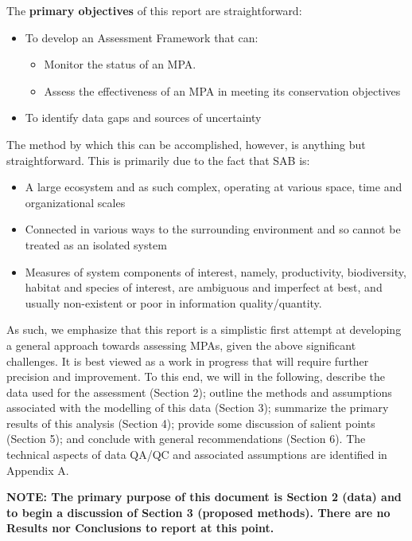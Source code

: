\documentclass[letterpaper,portrait,11pt]{scrartcl}
\numberwithin{equation}{section}		%
\numberwithin{figure}{section}		%
\numberwithin{table}{section}				%
\begin{document}
The \textbf{primary objectives} of this report are straightforward:

\begin{itemize}
	\item To develop an Assessment Framework that can:
  \begin{itemize}
    \item	Monitor the status of an MPA.
  	\item Assess the effectiveness of an MPA in meeting its conservation objectives
  \end{itemize}
  \item To identify data gaps and sources of uncertainty 
\end{itemize}

The method by which this can be accomplished, however, is anything but straightforward. This is primarily due to the fact that SAB is:

\begin{itemize}
	\item A large ecosystem and as such complex, operating at various space, time and organizational scales
	\item Connected in various ways to the surrounding environment and so cannot be treated as an isolated system
	\item Measures of system components of interest, namely, productivity, biodiversity, habitat and species of interest, are ambiguous and imperfect at best, and usually non-existent or poor in information quality/quantity.
\end{itemize}


As such, we emphasize that this report is a simplistic first attempt at developing a general approach towards assessing MPAs, given the above significant challenges. It is best viewed as a work in progress that will require further precision and improvement. To this end, we will in the following, describe the data used for the assessment (Section 2); outline the methods and assumptions associated with the modelling of this data (Section 3); summarize the primary results of this analysis (Section 4); provide some discussion of salient points (Section 5); and conclude with general recommendations (Section 6). The technical aspects of data QA/QC and associated assumptions are identified in Appendix A. 

\medskip

\textbf{NOTE: The primary purpose of this document is Section 2 (data) and to begin a discussion of Section 3 (proposed methods). There are no Results nor Conclusions to report at this point. }
\end{document}
